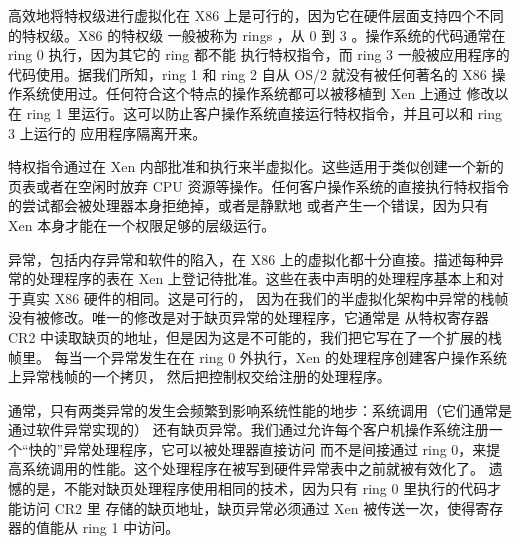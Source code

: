 高效地将特权级进行虚拟化在 X86 上是可行的，因为它在硬件层面支持四个不同的特权级。X86 的特权级
一般被称为 rings ，从 0 到 3 。操作系统的代码通常在 ring 0 执行，因为其它的 ring 都不能
执行特权指令，而 ring 3 一般被应用程序的代码使用。据我们所知，ring 1 和 ring 2 自从 OS/2
就没有被任何著名的 X86 操作系统使用过。任何符合这个特点的操作系统都可以被移植到 Xen 上通过
修改以在 ring 1 里运行。这可以防止客户操作系统直接运行特权指令，并且可以和 ring 3 上运行的
应用程序隔离开来。

特权指令通过在 Xen 内部批准和执行来半虚拟化。这些适用于类似创建一个新的页表或者在空闲时放弃
CPU 资源等操作。任何客户操作系统的直接执行特权指令的尝试都会被处理器本身拒绝掉，或者是静默地
或者产生一个错误，因为只有 Xen 本身才能在一个权限足够的层级运行。

异常，包括内存异常和软件的陷入，在 X86 上的虚拟化都十分直接。描述每种异常的处理程序的表在
Xen 上登记待批准。这些在表中声明的处理程序基本上和对于真实 X86 硬件的相同。这是可行的，
因为在我们的半虚拟化架构中异常的栈帧没有被修改。唯一的修改是对于缺页异常的处理程序，它通常是
从特权寄存器 CR2 中读取缺页的地址，但是因为这是不可能的，我们把它写在了一个扩展的栈帧里。
每当一个异常发生在在 ring 0 外执行，Xen 的处理程序创建客户操作系统上异常栈帧的一个拷贝，
然后把控制权交给注册的处理程序。

通常，只有两类异常的发生会频繁到影响系统性能的地步：系统调用（它们通常是通过软件异常实现的）
还有缺页异常。我们通过允许每个客户机操作系统注册一个“快的”异常处理程序，它可以被处理器直接访问
而不是间接通过 ring 0，来提高系统调用的性能。这个处理程序在被写到硬件异常表中之前就被有效化了。
遗憾的是，不能对缺页处理程序使用相同的技术，因为只有 ring 0 里执行的代码才能访问 CR2 里
存储的缺页地址，缺页异常必须通过 Xen 被传送一次，使得寄存器的值能从 ring 1 中访问。
